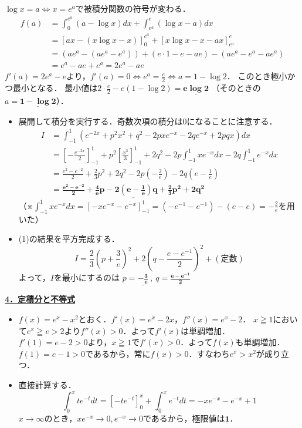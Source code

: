\documentclass[a4paper,11pt]{ltjsarticle}
\begin{document}
\begin{ans}
$\log x=a \iff x=e^a$で被積分関数の符号が変わる．
\begin{align*}
f(a)&=\int_0^{e^a}(a-\log x)dx+\int_{e^a}^e(\log x-a)dx\\
&=[ax-(x\log x-x)]_0^{e^a} + [x\log x-x-ax]_{e^a}^e\\
&=(ae^a - (ae^a-e^a)) + (e\cdot 1-e-ae) - (ae^a-e^a-ae^a)\\
&=e^a - ae + e^a = 2e^a - ae
\end{align*}
$f'(a)=2e^a-e$より，$f'(a)=0 \iff e^a=\frac{e}{2} \iff a=1-\log 2$．
このとき極小かつ最小となる．
最小値は$2\cdot\frac{e}{2}-e(1-\log 2) = \underline{\boldsymbol{e\log 2}}$ （そのときの$a=\underline{\boldsymbol{1-\log 2}}$）．
\end{ans}
\begin{ans}
\begin{itemize}
\item[(1)]展開して積分を実行する．奇数次項の積分は0になることに注意する．
\begin{align*}
I&=\int_{-1}^1(e^{-2x}+p^2x^2+q^2-2pxe^{-x}-2qe^{-x}+2pqx)dx\\
&=\left[-\frac{e^{-2x}}{2}\right]_{-1}^1 + p^2\left[\frac{x^3}{3}\right]_{-1}^1 + 2q^2 -2p\int_{-1}^1xe^{-x}dx -2q\int_{-1}^1e^{-x}dx\\
&=\frac{e^2-e^{-2}}{2} + \frac{2}{3}p^2 + 2q^2 -2p\left(-\frac{2}{e}\right) -2q\left(e-\frac{1}{e}\right)\\
&=\underline{\boldsymbol{\frac{e^2-e^{-2}}{2} + \frac{4}{e}p - 2\left(e-\frac{1}{e}\right)q + \frac{2}{3}p^2 + 2q^2}}
\end{align*}
（※$\int_{-1}^1 xe^{-x}dx=[-xe^{-x}-e^{-x}]_{-1}^1=(-e^{-1}-e^{-1})-(e-e)=-\frac{2}{e}$を用いた）
\item [(2)](1)の結果を平方完成する．
\[I = \frac{2}{3}\left(p+\frac{3}{e}\right)^2 + 2\left(q-\frac{e-e^{-1}}{2}\right)^2 + (\text{定数})\]
よって，$I$を最小にするのは
$p=\underline{\boldsymbol{-\frac{3}{e}}}~,~q=\underline{\boldsymbol{\frac{e-e^{-1}}{2}}}$
\end{itemize}
\end{ans}
\noindent \underline{{\large{\textbf{4．定積分と不等式}}}}
\begin{ans}
\begin{itemize}
    \item [(1)]$f(x)=e^x-x^2$とおく．$f'(x)=e^x-2x$，$f''(x)=e^x-2$．
    $x\geqq 1$において$e^x\geqq e > 2$より$f''(x)>0$．よって$f'(x)$は単調増加．
    $f'(1)=e-2>0$より，$x\geqq 1$で$f'(x)>0$．よって$f(x)$も単調増加．
    $f(1)=e-1>0$であるから，常に$f(x)>0$．すなわち$e^x>x^2$が成り立つ．
    \item [(2)]直接計算する．
    \[\int_0^x te^{-t}dt = [-te^{-t}]_0^x + \int_0^x e^{-t}dt = -xe^{-x} -e^{-x} + 1\]
    $x\to \infty$のとき，$xe^{-x}\to 0, e^{-x}\to 0$であるから，極限値は$\underline{\boldsymbol{1}}$．
\end{itemize}
\end{ans}
\end{document}
